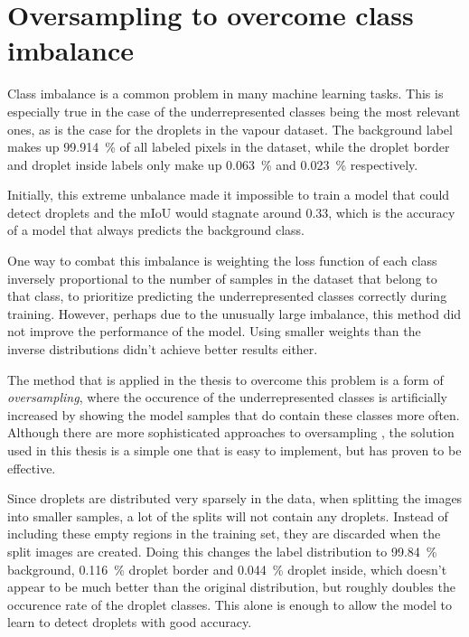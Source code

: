 \section{Oversampling to overcome class imbalance}
\label{sec:oversampling}

Class imbalance is a common problem in many machine learning tasks.
This is especially true in the case of the underrepresented classes being the most relevant ones, as is the case for the droplets in the vapour dataset.
The background label makes up \SI{99.914}{\percent} of all labeled pixels in the dataset, while the droplet border and droplet inside labels only make up \SI{0.063}{\percent} and \SI{0.023}{\percent} respectively.

Initially, this extreme unbalance made it impossible to train a model that could detect droplets and the mIoU would stagnate around \num{0.33}, which is the accuracy of a model that always predicts the background class.

One way to combat this imbalance is weighting the loss function of each class inversely proportional to the number of samples in the dataset that belong to that class, to prioritize predicting the underrepresented classes correctly during training. 
However, perhaps due to the unusually large imbalance, this method did not improve the performance of the model. Using smaller weights than the inverse distributions didn't achieve better results either.

The method that is applied in the thesis to overcome this problem is a form of \emph{oversampling}\cite{mohammedMachineLearningOversampling2020}, where the occurence of the underrepresented classes is artificially increased by showing the model samples that do contain these classes more often.
Although there are more sophisticated approaches to oversampling \cite{ReviewImbalancedData2017}, the solution used in this thesis is a simple one that is easy to implement, but has proven to be effective.

Since droplets are distributed very sparsely in the data, when splitting the images into smaller samples, a lot of the splits will not contain any droplets. 
Instead of including these empty regions in the training set, they are discarded when the split images are created.
Doing this changes the label distribution to \SI{99.84}{\percent} background, \SI{
0.116}{\percent} droplet border and \SI{0.044}{\percent} droplet inside, which doesn't appear to be much better than the original distribution, but roughly doubles the occurence rate of the droplet classes. 
This alone is enough to allow the model to learn to detect droplets with good accuracy.

